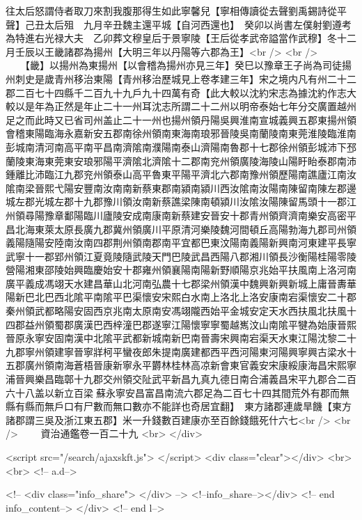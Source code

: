 往太后怒謂侍者取刀來割我腹那得生如此寧馨兒【寧相傳讀從去聲劉禹錫詩從平聲】己丑太后殂　九月辛丑魏主還平城【自河西還也】　癸卯以尚書左僕射劉遵考為特進右光禄大夫　乙卯葬文穆皇后于景寧陵【王后從孝武帝謚當作武穆】冬十二月壬辰以王畿諸郡為揚州【大明三年以丹陽等六郡為王】<br />
<br />
　　【畿】以揚州為東揚州【以會稽為揚州亦見三年】癸巳以豫章王子尚為司徒揚州刺史是歲青州移治東陽【青州移治歷城見上卷孝建三年】宋之境内凡有州二十二郡二百七十四縣千二百九十九戶九十四萬有奇【此大較以沈約宋志為據沈約作志大較以是年為正然是年止二十一州耳沈志所謂二十二州以明帝泰始七年分交廣置越州足之而此時又已省司州盖止二十一州也揚州領丹陽吳興淮南宣城義興五郡東揚州領會稽東陽臨海永嘉新安五郡南徐州領南東海南琅邪晉陵吳南蘭陵南東莞淮陵臨淮南彭城南清河南高平南平昌南濟隂南濮陽南泰山濟陽南魯郡十七郡徐州領彭城沛下邳蘭陵東海東莞東安琅邪陽平濟隂北濟隂十二郡南兖州領廣陵海陵山陽盱眙泰郡南沛鍾離比沛臨江九郡兖州領泰山高平魯東平陽平濟北六郡南豫州領歷陽南譙廬江南汝隂南梁晉熙弋陽安豐南汝南南新蔡東郡南潁南潁川西汝隂南汝陽南陳留南陳左郡邊城左郡光城左郡十九郡豫川領汝南新蔡譙梁陳南頓潁川汝隂汝陽陳留馬頭十一郡江州領尋陽豫章鄱陽臨川廬陵安成南康南新蔡建安晉安十郡青州領齊濟南樂安高密平昌北海東萊太原長廣九郡冀州領廣川平原清河樂陵魏河間頓丘高陽勃海九郡司州領義陽隨陽安陸南汝南四郡荆州領南郡南平宜都巴東汶陽南義陽新興南河東建平長寧武寧十一郡郢州領江夏竟陵隨武陵天門巴陵武昌西陽八郡湘川領長沙衡陽桂陽零陵營陽湘東邵陵始興臨慶始安十郡雍州領襄陽南陽新野順陽京兆始平扶風南上洛河南廣平義成馮翊天水建昌華山北河南弘農十七郡梁州領漢中魏興新興新城上庸晉夀華陽新巴北巴西北隂平南隂平巴渠懷安宋熙白水南上洛北上洛安康南宕渠懷安二十郡秦州領武都略陽安固西京兆南太原南安馮翊隴西始平金城安定天水西扶風北扶風十四郡益州領蜀郡廣漢巴西梓潼巴郡遂寧江陽懷寧寧蜀越嶲汶山南隂平犍為始康晉熙晉原永寧安固南漢中北隂平武都新城南新巴南晉壽宋興南宕渠天水東江陽沈黎二十九郡寧州領建寧晉寧牂柯平蠻夜郎朱提南廣建都西平西河陽東河陽興寧興古梁水十五郡廣州領南海蒼梧晉康新寧永平欝林桂林高凉新會東官義安宋康綏康海昌宋熙寧浦晉興樂昌臨鄣十九郡交州領交阯武平新昌九真九德日南合浦義昌宋平九郡合二百六十八盖以新立百梁蘇永寧安昌富昌南流六郡足為二百七十四其間荒外有郡而無縣有縣而無戶口有尸數而無口數亦不能詳也奇居宜翻】　東方諸郡連歲旱饑【東方諸郡謂三吳及浙江東五郡】米一升錢數百建康亦至百餘錢餓死什六七<br />
<br />
　　資治通鑑卷一百二十九  <br>
   </div> 

<script src="/search/ajaxskft.js"> </script>
 <div class="clear"></div>
<br>
<br>
 <!-- a.d-->

 <!--
<div class="info_share">
</div> 
-->
 <!--info_share--></div>   <!-- end info_content-->
  </div> <!-- end l-->

